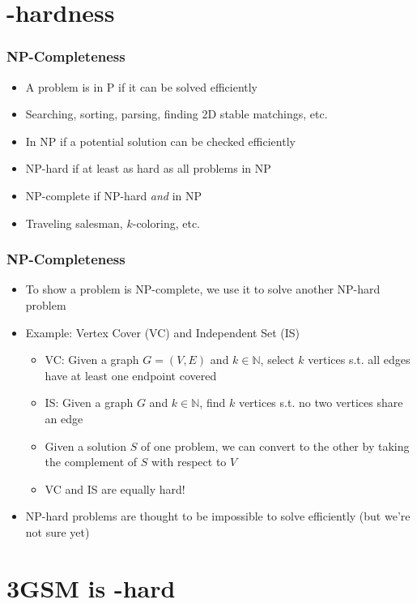 \documentclass[mathserif,serif]{beamer}
\begin{document}
\section{\NP-hardness}

\begin{frame}
  \frametitle{NP-Completeness}
  \begin{itemize}
  \item A problem is in P if it can be solved efficiently
  \item Searching, sorting, parsing, finding 2D stable matchings, etc.
  \item In NP if a potential solution can be checked efficiently
  \item NP-hard if at least as hard as all problems in NP
  \item NP-complete if NP-hard \emph{and} in NP
  \item Traveling salesman, $k$-coloring, etc.
  \end{itemize}
\end{frame}

\begin{frame}
  \frametitle{NP-Completeness}
  \begin{itemize}
  \item To show a problem is  NP-complete, we use it to solve another NP-hard problem
  \item Example: Vertex Cover (VC) and Independent Set (IS)
    \begin{itemize}
    \item VC: Given a graph $G = (V, E)$ and $k \in \mathbb{N}$, select $k$ vertices s.t. all edges have at least one endpoint covered
    \item IS: Given a graph $G$ and $k \in \mathbb{N}$, find $k$ vertices s.t. no two vertices share an edge
    \item Given a solution $S$ of one problem, we can convert to the other by taking the complement of $S$ with respect to $V$
    \item VC and IS are equally hard!
    \end{itemize}
  \item NP-hard problems are thought to be impossible to solve efficiently (but we're not sure yet)
  \end{itemize}
\end{frame}


\section{3GSM is \NP-hard}
\end{document}
